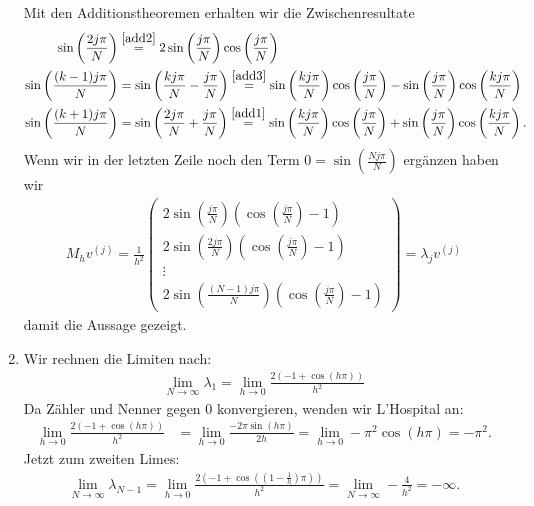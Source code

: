 \begin{solution}
\begin{enumerate}[label = \textbf{\alph*)}]
Mit den Additionstheoremen erhalten wir die Zwischenresultate
\begin{align*}
  \sin\left(\frac{2j\pi}{N}\right) &\stackrel{\eqref{add2}}{=}
  2\sin\left(\frac{j\pi}{N}\right)\cos\left(\frac{j\pi}{N}\right) \\
  \sin\left(\frac{(k-1)j\pi}{N}\right) &= \sin\left(\frac{kj\pi}{N}- \frac{j\pi}{N}\right)\stackrel{\eqref{add3}}{=}
  \sin\left(\frac{kj\pi}{N}\right)\cos\left(\frac{j\pi}{N}\right)
  - \sin\left(\frac{j\pi}{N}\right)\cos\left(\frac{kj\pi}{N}\right) \\
  \sin\left(\frac{(k+1)j\pi}{N}\right) &= \sin\left(\frac{2j\pi}{N}+ \frac{j\pi}{N}\right)
  \stackrel{\eqref{add1}}{=}
  \sin\left(\frac{kj\pi}{N}\right)\cos\left(\frac{j\pi}{N}\right)
  + \sin\left(\frac{j\pi}{N}\right)\cos\left(\frac{kj\pi}{N}\right).
\end{align*}
Wenn wir in der letzten Zeile noch den Term
$0 = \sin\left(\frac{Nj\pi}{N}\right)$ ergänzen haben wir
\begin{align*}
  M_h v^{(j)} = \frac{1}{h^2}\begin{pmatrix}
    2\sin\left(\frac{j\pi}{N}\right)\left(\cos\left(\frac{j\pi}{N}\right) - 1\right) \\
    2\sin\left(\frac{2j\pi}{N}\right)\left(\cos\left(\frac{j\pi}{N}\right) - 1\right)\\
    \vdots \\
    2\sin\left(\frac{(N-1)j\pi}{N}\right)\left(\cos\left(\frac{j\pi}{N}\right) - 1\right)
  \end{pmatrix}
  = \lambda_j v^{(j)}
\end{align*}
damit die Aussage gezeigt.
\item Wir rechnen die Limiten nach:
\begin{align*}
  \lim_{N \rightarrow \infty} \lambda_1 =
  \lim_{h \rightarrow 0} \frac{2\left(-1 + \cos\left(h\pi\right)\right)}{h^2}
\end{align*}
Da Zähler und Nenner gegen $0$ konvergieren, wenden wir L'Hospital an:
\begin{align*}
  \lim_{h \rightarrow 0} \frac{2\left(-1 + \cos\left(h\pi\right)\right)}{h^2}
  &= \lim_{h \rightarrow 0} \frac{-2\pi\sin(h\pi)}{2h}
  = \lim_{h \rightarrow 0} -\pi^2\cos(h\pi) = -\pi^2.
\end{align*}
Jetzt zum zweiten Limes:
\begin{align*}
\lim_{N \rightarrow \infty} \lambda_{N-1} =
\lim_{h \rightarrow 0} \frac{2\left(-1 + \cos\left((1 - \frac{1}{h})\pi\right)\right)}{h^2}
= \lim_{N \rightarrow \infty} -\frac{4}{h^2} = -\infty.
\end{align*}
\end{enumerate}
\end{solution}
